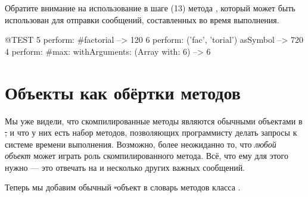 \documentclass[a4paper,10pt,twoside]{book}
\begin{document}
Обратите внимание на использование в шаге (13) метода , который может быть использован для отправки сообщений, составленных во время выполнения.
\begin{code}{@TEST}
5 perform: #factorial                                             --> 120
6 perform: ('fac', 'torial') asSymbol                       --> 720
4 perform: #max: withArguments: (Array with: 6) --> 6
\end{code}

\section{Объекты как обёртки методов}

Мы уже видели, что скомпилированные методы являются обычными объектами в \st, и что у них есть набор методов, позволяющих программисту делать запросы к системе времени выполнения.
Возможно, более неожиданно то, что \emph{любой объект} может играть роль скомпилированного метода. Всё, что ему для этого нужно --- это отвечать на  и несколько других важных сообщений.


Теперь мы добавим обычный \st-объект в словарь методов класса  .

\dothis{Выполните \lct{Demo methodDict at: \#answer42 put: ObjectsAsMethodsExample new.}
Теперь попробуйте напечатать результат выражения \ct{Demo new answer42}. На этот раз ответ будет --- \ct{42}.}
\end{document}
